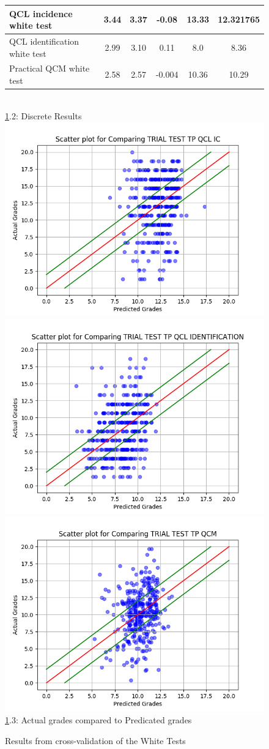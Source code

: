 \documentclass[a4paper,11pt]{report}
\numberwithin{figure}{section} %
\begin{document}
\begin{figure}[H]
\begin{tabular}{| l | c | c | c | c | c |}
      \tiny{QCL incidence white test} & \tiny{3.44} & \tiny{3.37} & \tiny{-0.08} & \tiny{13.33} & \tiny{12.321765}\\ \hline
      \tiny{QCL identification white test} & \tiny{2.99} & \tiny{3.10} & \tiny{0.11} & \tiny{8.0} & \tiny{8.36}\\ \hline
      \tiny{Practical QCM white test} & \tiny{2.58} & \tiny{2.57} & \tiny{-0.004} & \tiny{10.36} & \tiny{10.29}\\
      \hline
      \end{tabular}\\
      \vspace{0.5cm}
      \ref{fig:results_white}.2: Discrete Results\\
      \vspace{0.3cm}
      \includegraphics[width=.3\linewidth]{cv_comp_TRIAL_TEST_TP_QCL_IC_2018-04-27_14_35_12.png}
  	  \includegraphics[width=.3\linewidth]{cv_comp_TRIAL_TEST_TP_QCL_IDENTIFICATION_2018-04-27_14_31_55.png}
      \includegraphics[width=.3\linewidth]{cv_comp_TRIAL_TEST_TP_QCM_2018-04-27_17_16_59.png}
      \\
      \ref{fig:results_white}.3: Actual grades compared to Predicated grades
      \caption{Results from cross-validation of the White Tests}
      \label{fig:results_white}
    \end{figure}
    
\end{document}
